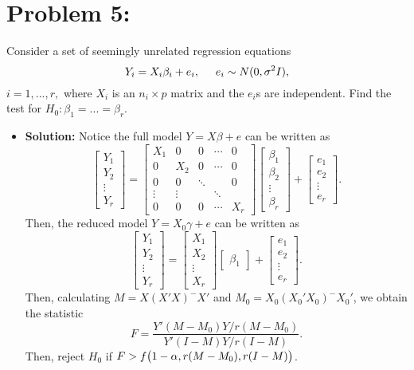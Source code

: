 \documentclass[11pt]{article}
\begin{document}
\section*{Problem 5:}  Consider a set of seemingly unrelated regression equations
\[
Y_i = X_i\beta_i + e_i, \hspace{5mm} e_i\sim N(0,\sigma^2I),
\]
$i = 1,...,r,$ where $X_i$ is an $n_i\times p$ matrix and the $e_i$s are independent.  Find the test for $H_0\colon \beta_1=...=\beta_r$.
\begin{itemize}
\item[] {\bf Solution:}  Notice the full model $Y=X\beta + e$ can be written as
\[
\begin{bmatrix}
Y_1 \\ Y_2 \\ \vdots \\ Y_r
\end{bmatrix} = \begin{bmatrix}
X_1 & 0 & 0 & \cdots & 0 \\
0 & X_2 & 0 & \cdots & 0 \\
0 & 0 & \ddots & & 0 \\
\vdots & \vdots & & \ddots \\
0 & 0 & 0 & \cdots & X_r
\end{bmatrix} \begin{bmatrix}
\beta_1 \\ \beta_2 \\ \vdots \\ \beta_r
\end{bmatrix} + \begin{bmatrix}
e_1 \\ e_2 \\ \vdots \\ e_r
\end{bmatrix}.
\]
Then, the reduced model $Y = X_0\gamma + e$ can be written as
\[
\begin{bmatrix}
Y_1 \\ Y_2 \\ \vdots \\ Y_r
\end{bmatrix} = \begin{bmatrix}
X_1 \\ X_2 \\ \vdots \\ X_r
\end{bmatrix}\begin{bmatrix}
\beta_1
\end{bmatrix} + \begin{bmatrix}
e_1 \\ e_2 \\ \vdots \\ e_r
\end{bmatrix}.
\]
Then, calculating $M = X(X'X)^-X'$ and $M_0 = X_0(X_0'X_0)^-X_0'$, we obtain the statistic
\[
F = \frac{Y'(M-M_0)Y/r(M-M_0)}{Y'(I-M)Y/r(I-M)}.
\]
Then, reject $H_0$ if $F>f\big{(}1-\alpha, r(M-M_0), r(I-M)\big{)}$.
\end{itemize}
\end{document}
